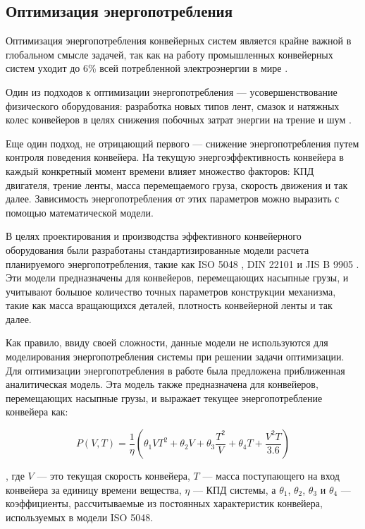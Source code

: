 \documentclass[specification,annotation,times]{itmo-student-thesis}
\theoremstyle{definition}
\begin{document}
\subsection{Оптимизация энергопотребления}

Оптимизация энергопотребления конвейерных систем является крайне важной в
глобальном смысле задачей, так как на работу промышленных конвейерных систем
уходит до 6\% всей потребленной электроэнергии в мире \cite{halepoto2016design}.

Один из подходов к оптимизации энергопотребления --- усовершенствование
физического оборудования: разработка новых типов лент, смазок и натяжных колес
конвейеров в целях снижения побочных затрат энергии на трение и шум
\cite{staniak1996energy}.

Еще один подход, не отрицающий первого --- снижение энергопотребления путем
контроля поведения конвейера. На текущую энергоэффективность конвейера в каждый
конкретный момент времени влияет множество факторов: КПД двигателя, трение
ленты, масса перемещаемого груза, скорость движения и так далее. Зависимость
энергопотребления от этих параметров можно выразить с помощью математической
модели.

В целях проектирования и производства эффективного конвейерного
оборудования были разработаны стандартизированные модели расчета планируемого
энергопотребления, такие как ISO 5048 \cite{ISO5048}, DIN 22101 \cite{DIN22101}
и JIS B 9905 \cite{JISB8805}. Эти модели предназначены для конвейеров,
перемещающих насыпные грузы, и учитывают большое количество точных параметров
конструкции механизма, такие как масса вращающихся деталей, плотность
конвейерной ленты и так далее.

Как правило, ввиду своей сложности, данные модели не используются для
моделирования энергопотребления системы при решении задачи оптимизации. Для
оптимизации энергопотребления в работе \cite{zhang2011modeling} была предложена
приближенная аналитическая модель. Эта модель также предназначена для
конвейеров, перемещающих насыпные грузы, и выражает текущее энергопотребление
конвейера как:

\begin{equation}\label{zhang-model}
  P(V, T) = \frac{1}{\eta} \left( \theta_1 VT^2 + \theta_2 V + \theta_3 \frac{T^2}{V}
  + \theta_4 T + \frac{V^2T}{3.6} \right)
\end{equation}

, где $V$ --- это текущая скорость конвейера, $T$ --- масса поступающего на вход
конвейера за единицу времени вещества, $\eta$ --- КПД системы, а $\theta_1$,
$\theta_2$, $\theta_3$ и $\theta_4$ --- коэффициенты, рассчитываемые из
постоянных характеристик конвейера, используемых в модели ISO 5048. 
\end{document}

